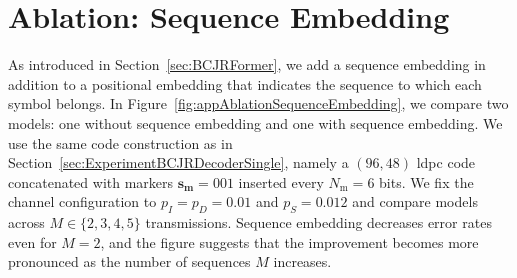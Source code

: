 \documentclass[conference,letterpaperu]{IEEEtran}
\newcommand{\pdel}{\ensuremath{p_D}}
\newcommand{\pins}{\ensuremath{p_I}}
\newcommand{\psub}{\ensuremath{p_S}}
\newcommand{\marker}{\ensuremath{\bm{s_{\text{m}}}}}
\newcommand{\markerFreq}{\ensuremath{N_{\text{m}}}}
\begin{document}
\section{Ablation: Sequence Embedding}
\label{sec:appSequenceEmbedding}
As introduced in Section~\ref{sec:BCJRFormer}, we add a sequence embedding in addition to a positional embedding that indicates the sequence to which each symbol belongs. In Figure~\ref{fig:appAblationSequenceEmbedding}, we compare two models: one without sequence embedding and one with sequence embedding. We use the same code construction as in Section~\ref{sec:ExperimentBCJRDecoderSingle}, namely a $(96, 48)$ \ac{ldpc} code concatenated with markers $\marker=001$ inserted every $\markerFreq = 6$ bits. We fix the channel configuration to $\pins = \pdel = 0.01$ and $\psub = 0.012$ and compare models across $M \in \{2, 3, 4, 5\}$ transmissions. Sequence embedding decreases error rates even for $M=2$, and the figure suggests that the improvement becomes more pronounced as the number of sequences $M$ increases. 
\end{document}
